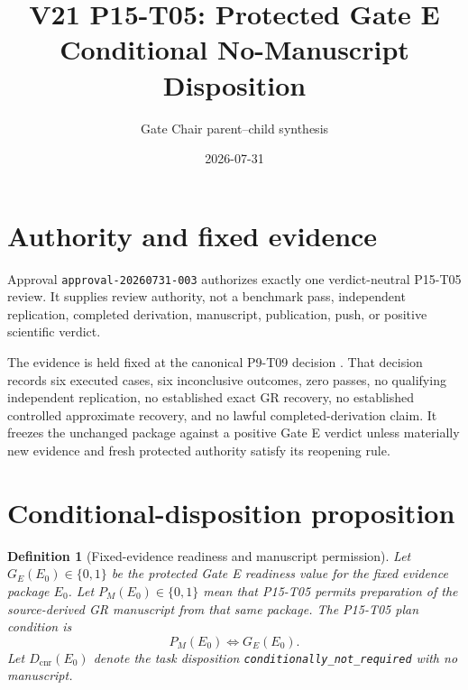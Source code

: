 \documentclass[11pt]{article}
\title{V21 P15-T05: Protected Gate E Conditional No-Manuscript Disposition}
\author{Gate Chair parent--child synthesis}
\date{2026-07-31}
\newtheorem{definition}{Definition}
\begin{document}
\maketitle

\begin{center}
\end{center}

\section{Authority and fixed evidence}

Approval \texttt{approval-20260731-003} authorizes exactly one verdict-neutral
P15-T05 review.  It supplies review authority, not a benchmark pass,
independent replication, completed derivation, manuscript, publication, push,
or positive scientific verdict.

The evidence is held fixed at the canonical P9-T09 decision
.
That decision records six executed cases, six inconclusive outcomes, zero
passes, no qualifying independent replication, no established exact GR
recovery, no established controlled approximate recovery, and no lawful
completed-derivation claim.  It freezes the unchanged package against a
positive Gate E verdict unless materially new evidence and fresh protected
authority satisfy its reopening rule.

\section{Conditional-disposition proposition}

\begin{definition}[Fixed-evidence readiness and manuscript permission]
Let $G_E(E_0)\in\{0,1\}$ be the protected Gate E readiness value for the fixed
evidence package $E_0$.  Let $P_M(E_0)\in\{0,1\}$ mean that P15-T05 permits
preparation of the source-derived GR manuscript from that same package.  The
P15-T05 plan condition is
\[
  P_M(E_0)\Longleftrightarrow G_E(E_0).
\]
Let $D_{\mathrm{cnr}}(E_0)$ denote the task disposition
\texttt{conditionally\_not\_required} with no manuscript.
\end{definition}
\end{document}
